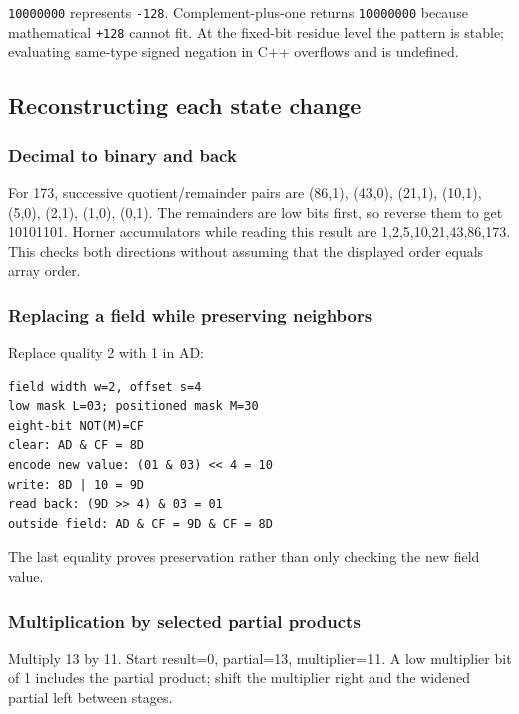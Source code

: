\texttt{10000000} represents \texttt{-128}. Complement-plus-one returns \texttt{10000000} because mathematical \texttt{+128} cannot fit. At the fixed-bit residue level the pattern is stable; evaluating same-type signed negation in C++ overflows and is undefined.

\subsection{Reconstructing each state change}\label{appendix-92ff77d4dfdc-reconstructing-each-state-change}

\subsubsection{Decimal to binary and back}\label{appendix-92ff77d4dfdc-decimal-to-binary-and-back}

For 173, successive quotient/remainder pairs are (86,1), (43,0), (21,1), (10,1), (5,0), (2,1), (1,0), (0,1). The remainders are low bits first, so reverse them to get 10101101. Horner accumulators while reading this result are 1,2,5,10,21,43,86,173. This checks both directions without assuming that the displayed order equals array order.

\subsubsection{Replacing a field while preserving neighbors}\label{appendix-92ff77d4dfdc-replacing-a-field-while-preserving-neighbors}

Replace quality 2 with 1 in AD:

\begin{verbatim}
field width w=2, offset s=4
low mask L=03; positioned mask M=30
eight-bit NOT(M)=CF
clear: AD & CF = 8D
encode new value: (01 & 03) << 4 = 10
write: 8D | 10 = 9D
read back: (9D >> 4) & 03 = 01
outside field: AD & CF = 9D & CF = 8D
\end{verbatim}

The last equality proves preservation rather than only checking the new field value.

\subsubsection{Multiplication by selected partial products}\label{appendix-92ff77d4dfdc-multiplication-by-selected-partial-products}

Multiply 13 by 11. Start result=0, partial=13, multiplier=11. A low multiplier bit of 1 includes the partial product; shift the multiplier right and the widened partial left between stages.

